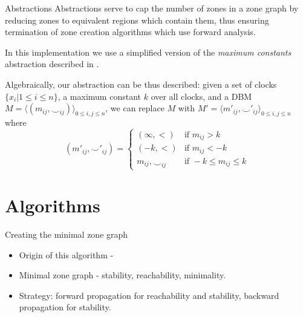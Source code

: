 \documentclass{beamer}
\begin{document}
\begin{frame}{Abstractions}
Abstractions serve to cap the number of zones in a
zone graph by reducing zones to equivalent regions which contain them,
thus ensuring termination of zone creation algorithms which use
forward analysis.

In this implementation we use a simplified version of the
\emph{maximum constants} abstraction described in
\cite{Behrmann03staticguard}.

Algebraically, our abstraction can be thus described: given a set of
clocks $\{x_i | 1 \leq i \leq n \}$, a maximum constant $k$ over all
clocks, and a DBM $M = \langle (m_{ij}, \smile _{ij})\rangle _{0 \leq
  i,j \leq n} $, we can replace $M$ with $M' = \langle m'_{ij}, \smile
'_{ij}\rangle _{0 \leq i,j \leq n} $ where
\begin{displaymath}
  (m'_{ij}, \smile'_{ij}) =
    \begin{cases}
      (\infty, <)  & \mbox{if } m_{ij} > k \\
      (-k, <)  & \mbox{if } m_{ij} < -k \\
      m_{ij}, \smile _{ij} & \mbox{if } -k \leq m_{ij} \leq k
    \end{cases}
\end{displaymath}

\end{frame}

\section{Algorithms}

\begin{frame}{Creating the minimal zone graph}

\begin{itemize}

\item Origin of this algorithm - \cite{DBLP:conf/cav/GuhaNA12}

\item Minimal zone graph - stability, reachability, minimality.

\item Strategy: forward propagation for reachability and stability,
  backward propagation for stability.

\end{itemize}

\end{frame}
\end{document}
